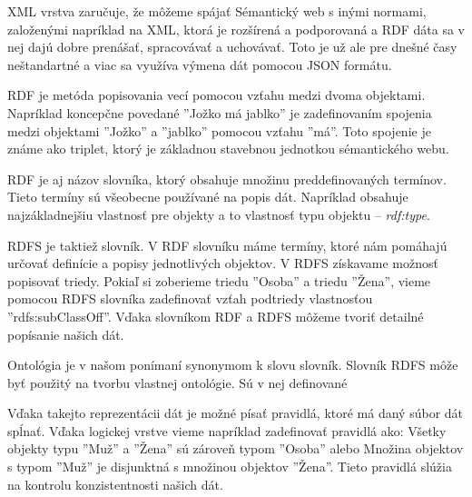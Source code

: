 \documentclass[12pt, a4paper, oneside]{book}
\begin{document}
XML vrstva zaručuje, že môžeme spájať Sémantický web s inými normami, založenými napríklad na XML, ktorá je rozšírená a podporovaná a RDF dáta sa v nej dajú dobre prenášať, spracovávať a uchovávať. Toto je už ale pre dnešné časy neštandartné a viac sa využíva výmena dát pomocou JSON formátu. 


RDF je metóda popisovania vecí pomocou vzťahu medzi dvoma objektami. Napríklad koncepčne povedané ''Jožko má jablko'' je zadefinovaním spojenia medzi objektami ''Jožko'' a ''jablko'' pomocou vzťahu ''má''.
Toto spojenie je známe ako triplet, ktorý je základnou stavebnou jednotkou sémantického webu. 


RDF je aj názov slovníka, ktorý obsahuje množinu preddefinovaných termínov. Tieto termíny sú všeobecne používané na popis dát. Napríklad obsahuje najzákladnejšiu vlastnosť pre objekty a to vlastnosť typu objektu -- \textit{rdf:type}. 


RDFS je taktiež slovník. V RDF slovníku máme termíny, ktoré nám pomáhajú určovať definície a popisy jednotlivých objektov. V RDFS získavame možnosť popisovať triedy. Pokiaľ si zoberieme triedu ''Osoba'' a triedu ''Žena'', vieme pomocou RDFS slovníka zadefinovať vzťah podtriedy vlastnosťou ''rdfs:subClassOff''. Vďaka slovníkom RDF a RDFS môžeme tvoriť detailné popísanie našich dát.


Ontológia je v našom ponímaní synonymom k slovu slovník. Slovník RDFS môže byť použitý na tvorbu vlastnej ontológie. Sú v nej definované 


Vďaka takejto reprezentácii dát je možné písať pravidlá, ktoré má daný súbor dát spĺnať. Vďaka logickej vrstve vieme napríklad zadefinovať pravidlá ako: Všetky objekty typu ''Muž'' a ''Žena'' sú zároveň typom ''Osoba'' alebo Množina objektov s typom ''Muž'' je disjunktná s množinou objektov ''Žena''. Tieto pravidlá slúžia na kontrolu konzistentnosti našich dát.


\end{document}
